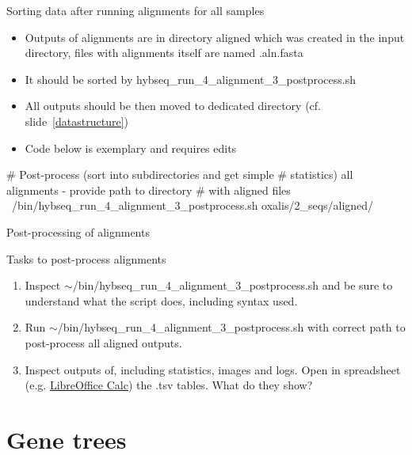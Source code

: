 \documentclass[compress, ucs, xelatex, 11pt, xcolor=x11names, aspectratio=169,
	hyperref={
		bookmarks=true,
		unicode=true,
		colorlinks=true,
		pdftitle={HybSeq course},
		plainpages=false,
		pdfauthor={Vojtech Zeisek},
		pdfsubject={Practical processing of HybSeq target enrichment sequencing data on computing grids like MetaCentrum},
		pdfcreator={XeLaTeX},
		pdfkeywords={BASH, command line, GNU, HybSeq, Linux, MetaCentrum, sequencing shell, target enrichment},
		linkcolor=Turquoise4, %
		anchorcolor=DodgerBlue4, %
		citecolor=DodgerBlue4, %
		filecolor=DodgerBlue4, %
		menucolor=Tan4, %
		urlcolor=DarkOliveGreen4, %
		pdftex},
	url={hyphens, lowtilde} %
	]{beamer}
\renewcommand{\texttt}[1]{\colorbox{Cornsilk2}{{\ttfamily #1}}}
\renewcommand{\alert}[1]{\textcolor{OrangeRed3}{#1}}
\begin{document}
\begin{frame}[fragile]{Sorting data after running alignments for all samples}
	\begin{itemize}
		\item Outputs of alignments are in directory \texttt{aligned} which was created in the input directory, files with alignments itself are named \texttt{*.aln.fasta}
		\item It should be sorted by \texttt{hybseq\_run\_4\_alignment\_3\_postprocess.sh}
		\item All outputs should be then moved to dedicated directory (cf. slide~\ref{datastructure})
		\item \alert{Code below is exemplary and requires edits}
	\end{itemize}
	\begin{bashcode}
    # Post-process (sort into subdirectories and get simple
    # statistics) all alignments - provide path to directory
    # with aligned files
    ~/bin/hybseq_run_4_alignment_3_postprocess.sh oxalis/2_seqs/aligned/
	\end{bashcode}
\end{frame}

\begin{frame}{Post-processing of alignments}
	\begin{exampleblock}{Tasks to post-process alignments}
		\begin{enumerate}
			\item Inspect \texttt{$\sim$/bin/hybseq\_run\_4\_alignment\_3\_postprocess.sh} and be sure to understand what the script does, including syntax used.
			\item Run \texttt{$\sim$/bin/hybseq\_run\_4\_alignment\_3\_postprocess.sh}  with correct path to post-process all aligned outputs.
			\item Inspect outputs of, including statistics, images and logs. Open in spreadsheet (e.g. \href{https://www.libreoffice.org/}{LibreOffice Calc}) the \texttt{*.tsv} tables. What do they show?
		\end{enumerate}
	\end{exampleblock}
\end{frame}

\section{Gene trees}
\end{document}
